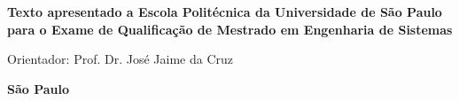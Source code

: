 \pagestyle{empty}

%
%

\cleardoublepage

\pagestyle{fancy}



\thispagestyle{empty}

\begin{center}
{\LARGE \nomedoaluno}
\par
\vspace{200pt}
{\Huge \titulo}
\end{center}
\par
\vspace{90pt}
\hspace*{175pt}\parbox{7.6cm}{{\large  \textbf{Texto apresentado a Escola Politécnica da Universidade de São Paulo para o Exame de Qualificação de Mestrado em Engenharia de Sistemas}}}%

\par
\vspace{1em}
\hspace*{175pt}\parbox{7.6cm}{{\large Orientador: Prof. Dr. José Jaime da Cruz}}

\par
\vfill
\begin{center}
\textbf{{\large São Paulo}\\
{\large \the\year}}
\end{center}

